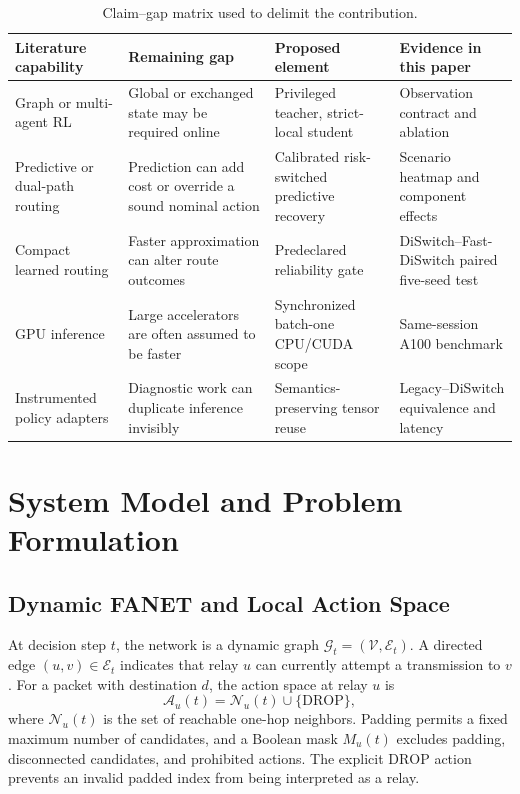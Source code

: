 \documentclass[drones,article,submit,moreauthors]{Definitions/mdpi}
\newcommand{\drop}{\mathrm{DROP}}\newcommand{\pdr}{\mathrm{PDR}}
\begin{document}
\begin{table}[H]
\caption{Claim--gap matrix used to delimit the contribution.}
\label{tab:novelty}
\centering\small
\begin{tabularx}{\textwidth}{p{}p{}p{}X}
\toprule
Literature capability & Remaining gap & Proposed element & Evidence in this paper \\
\midrule
Graph or multi-agent RL & Global or exchanged state may be required online & Privileged teacher, strict-local student & Observation contract and ablation \\
Predictive or dual-path routing & Prediction can add cost or override a sound nominal action & Calibrated risk-switched predictive recovery & Scenario heatmap and component effects \\
Compact learned routing & Faster approximation can alter route outcomes & Predeclared reliability gate & DiSwitch--Fast-DiSwitch paired five-seed test \\
GPU inference & Large accelerators are often assumed to be faster & Synchronized batch-one CPU/CUDA scope & Same-session A100 benchmark \\
Instrumented policy adapters & Diagnostic work can duplicate inference invisibly & Semantics-preserving tensor reuse & Legacy--DiSwitch equivalence and latency \\
\bottomrule
\end{tabularx}
\end{table}

\section{System Model and Problem Formulation}

\subsection{Dynamic FANET and Local Action Space}

At decision step $t$, the network is a dynamic graph $\mathcal{G}_t=(\mathcal{V},\mathcal{E}_t)$. A directed edge $(u,v)\in\mathcal{E}_t$ indicates that relay $u$ can currently attempt a transmission to $v$. For a packet with destination $d$, the action space at relay $u$ is
\begin{equation}
\mathcal{A}_u(t)=\mathcal{N}_u(t)\cup\{\drop\},
\end{equation}
where $\mathcal{N}_u(t)$ is the set of reachable one-hop neighbors. Padding permits a fixed maximum number of candidates, and a Boolean mask $M_u(t)$ excludes padding, disconnected candidates, and prohibited actions. The explicit $\drop$ action prevents an invalid padded index from being interpreted as a relay.
\end{document}
